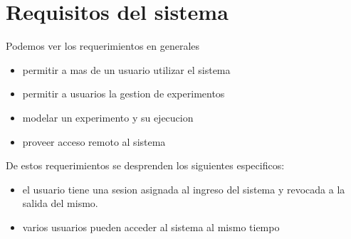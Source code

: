 \section{Requisitos del sistema}

Podemos ver los requerimientos en generales

\begin{itemize}
\item permitir a mas de un usuario utilizar el sistema
\item permitir a usuarios la gestion de experimentos
\item modelar un experimento y su ejecucion
\item proveer acceso remoto al sistema
\end{itemize}
De estos requerimientos se desprenden los siguientes especificos:

\begin{itemize}
\item el usuario tiene una sesion asignada al ingreso del sistema y revocada a la salida del mismo.
\item varios usuarios pueden acceder al sistema al mismo tiempo
\end{itemize}

